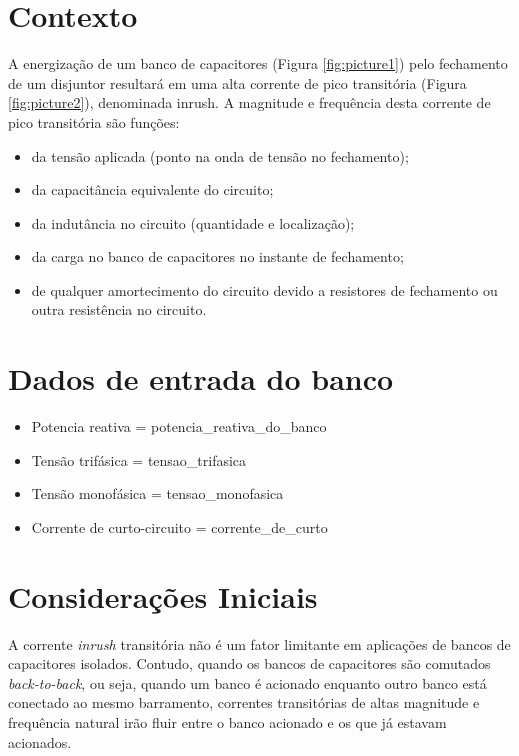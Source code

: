 \documentclass[a4paper]{article}
\begin{document}

\section{Contexto}
A energização de um banco de capacitores (Figura \ref{fig:picture1}) pelo fechamento de um disjuntor resultará em uma alta corrente de pico transitória (Figura \ref{fig:picture2}), denominada inrush. A magnitude e frequência desta corrente de pico transitória são funções:
\begin{itemize}[label=\textendash]
\item	da tensão aplicada (ponto na onda de tensão no fechamento);
\item	da capacitância equivalente do circuito;
\item	da indutância no circuito (quantidade e localização);
\item	da carga no banco de capacitores no instante de fechamento;
\item	de qualquer amortecimento do circuito devido a resistores de fechamento ou outra resistência no circuito.
\end{itemize}
	
\section{Dados de entrada do banco}
\begin{itemize}[label=\textendash]
	\item	Potencia reativa  = {{potencia_reativa_do_banco}}
	\item	Tensão trifásica  = {{tensao_trifasica}}
	\item	Tensão monofásica  = {{tensao_monofasica}}
	\item	Corrente de curto-circuito  = {{corrente_de_curto}}
\end{itemize}

\begin{center}
\end{center}



	
	
\section{Considerações Iniciais}

A corrente \textit{inrush} transitória não é um fator limitante em aplicações de bancos de capacitores isolados. Contudo, quando os bancos de capacitores são comutados \textit{back-to-back}, ou seja, quando um banco é acionado enquanto outro banco está conectado ao mesmo barramento, correntes transitórias de altas magnitude e frequência natural irão fluir entre o banco acionado e os que já estavam acionados.
\end{document}
